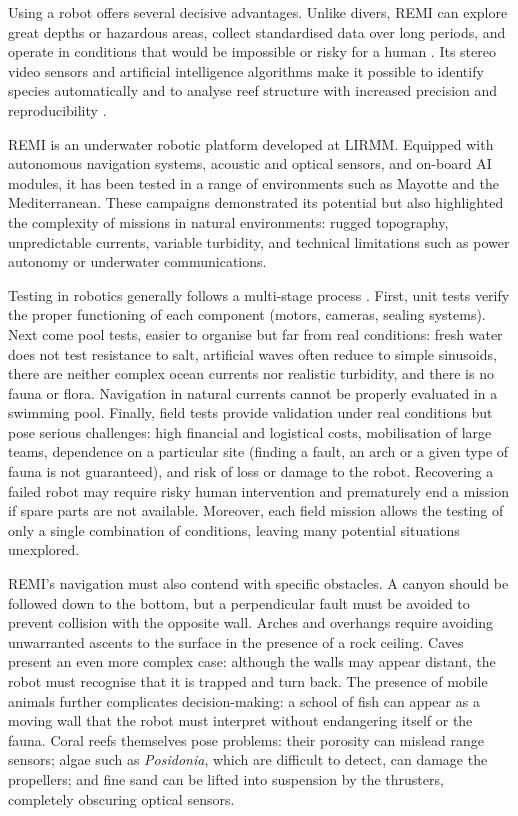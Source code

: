 Using a robot offers several decisive advantages. Unlike divers, REMI can explore great depths or hazardous areas, collect standardised data over long periods, and operate in conditions that would be impossible or risky for a human \cite{GonzalezGarcia2020}. Its stereo video sensors and artificial intelligence algorithms make it possible to identify species automatically and to analyse reef structure with increased precision and reproducibility \cite{Villon2020,Saleh2022}.

REMI is an underwater robotic platform developed at LIRMM. Equipped with autonomous navigation systems, acoustic and optical sensors, and on-board AI modules, it has been tested in a range of environments such as Mayotte and the Mediterranean. These campaigns demonstrated its potential but also highlighted the complexity of missions in natural environments: rugged topography, unpredictable currents, variable turbidity, and technical limitations such as power autonomy or underwater communications.

Testing in robotics generally follows a multi-stage process \cite{GonzalezGarcia2020}. First, unit tests verify the proper functioning of each component (motors, cameras, sealing systems). Next come pool tests, easier to organise but far from real conditions: fresh water does not test resistance to salt, artificial waves often reduce to simple sinusoids, there are neither complex ocean currents nor realistic turbidity, and there is no fauna or flora. Navigation in natural currents cannot be properly evaluated in a swimming pool. Finally, field tests provide validation under real conditions but pose serious challenges: high financial and logistical costs, mobilisation of large teams, dependence on a particular site (finding a fault, an arch or a given type of fauna is not guaranteed), and risk of loss or damage to the robot. Recovering a failed robot may require risky human intervention and prematurely end a mission if spare parts are not available. Moreover, each field mission allows the testing of only a single combination of conditions, leaving many potential situations unexplored.

REMI's navigation must also contend with specific obstacles. A canyon should be followed down to the bottom, but a perpendicular fault must be avoided to prevent collision with the opposite wall. Arches and overhangs require avoiding unwarranted ascents to the surface in the presence of a rock ceiling. Caves present an even more complex case: although the walls may appear distant, the robot must recognise that it is trapped and turn back. The presence of mobile animals further complicates decision-making: a school of fish can appear as a moving wall that the robot must interpret without endangering itself or the fauna. Coral reefs themselves pose problems: their porosity can mislead range sensors; algae such as \emph{Posidonia}, which are difficult to detect, can damage the propellers; and fine sand can be lifted into suspension by the thrusters, completely obscuring optical sensors.

